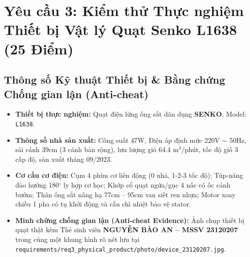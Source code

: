 \documentclass[11pt,a4paper]{article}
\newcommand{\filepath}[1]{\nolinkurl{#1}}
\begin{document}
\section{Yêu cầu 3: Kiểm thử Thực nghiệm Thiết bị Vật lý Quạt Senko L1638 (25 Điểm)}

\subsection{Thông số Kỹ thuật Thiết bị \& Bằng chứng Chống gian lận (Anti-cheat)}
\begin{itemize}
    \item \textbf{Thiết bị thực nghiệm:} Quạt điện lửng ống sắt dân dụng \textbf{SENKO}, Model: \texttt{L1638}.
    \item \textbf{Thông số nhà sản xuất:} Công suất 47W, Điện áp định mức 220V $\sim$ 50Hz, sải cánh 39cm (3 cánh bản rộng), lưu lượng gió 64.4 m$^3$/phút, tốc độ gió 3 cấp độ, sản xuất tháng 09/2023.
    \item \textbf{Cơ cấu cơ điện:} Cụm 4 phím cơ liên động (0 nhả, 1-2-3 tốc độ); Túp-năng đảo hướng 180$^\circ$ ly hợp cơ học; Khớp cổ quạt ngửa/gục 4 nấc có ốc cánh bướm; Thân ống sắt nâng hạ 77cm -- 95cm van siết ren nhựa; Motor xoay chiều 1 pha có tụ khởi động và cầu chì nhiệt bảo vệ stator.
    \item \textbf{Minh chứng chống gian lận (Anti-cheat Evidence):} Ảnh chụp thiết bị quạt thật kèm Thẻ sinh viên \textbf{NGUYỄN BẢO AN -- MSSV 23120207} trong cùng một khung hình rõ nét lưu tại \filepath{requirements/req3_physical_product/photo/device_23120207.jpg}.
\end{itemize}
\end{document}
